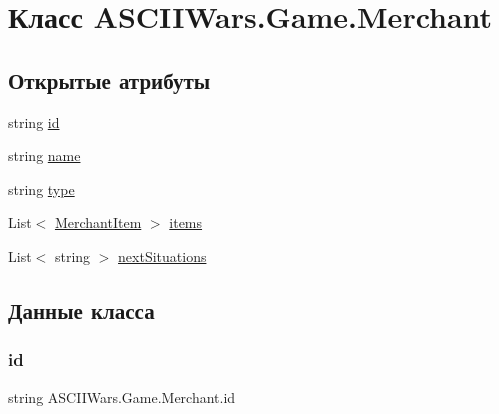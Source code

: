 \hypertarget{class_a_s_c_i_i_wars_1_1_game_1_1_merchant}{}\section{Класс A\+S\+C\+I\+I\+Wars.\+Game.\+Merchant}
\label{class_a_s_c_i_i_wars_1_1_game_1_1_merchant}
\subsection*{Открытые атрибуты}
\begin{DoxyCompactItemize}
\item 
string \hyperlink{class_a_s_c_i_i_wars_1_1_game_1_1_merchant_a6cc3b433c5be3021a26bdab57d9534e8}{id}
\item 
string \hyperlink{class_a_s_c_i_i_wars_1_1_game_1_1_merchant_ada225b0cd9c12c73b70729b821541d90}{name}
\item 
string \hyperlink{class_a_s_c_i_i_wars_1_1_game_1_1_merchant_a49fe8caa978e4dd0199f0b583f1c99a3}{type}
\item 
List$<$ \hyperlink{class_a_s_c_i_i_wars_1_1_game_1_1_merchant_item}{Merchant\+Item} $>$ \hyperlink{class_a_s_c_i_i_wars_1_1_game_1_1_merchant_aa35fa4b7dabae111e0819b68866fceba}{items}
\item 
List$<$ string $>$ \hyperlink{class_a_s_c_i_i_wars_1_1_game_1_1_merchant_a882142ada4b87c08a3a6b9e1c895c7c0}{next\+Situations}
\end{DoxyCompactItemize}


\subsection{Данные класса}
\hypertarget{class_a_s_c_i_i_wars_1_1_game_1_1_merchant_a6cc3b433c5be3021a26bdab57d9534e8}{}\label{class_a_s_c_i_i_wars_1_1_game_1_1_merchant_a6cc3b433c5be3021a26bdab57d9534e8} 
\subsubsection{\texorpdfstring{id}{id}}
{\footnotesize\ttfamily string A\+S\+C\+I\+I\+Wars.\+Game.\+Merchant.\+id}

\hypertarget{class_a_s_c_i_i_wars_1_1_game_1_1_merchant_aa35fa4b7dabae111e0819b68866fceba}{}\label{class_a_s_c_i_i_wars_1_1_game_1_1_merchant_aa35fa4b7dabae111e0819b68866fceba} 
